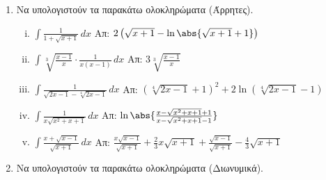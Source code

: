


\everymath{\displaystyle}
\pagestyle{askhseis}



\begin{center}
  \minibox{\large\bfseries \textcolor{Col1}{Ολοκληρώματα}}
\end{center}

\vspace{\baselineskip}

\begin{enumerate}
  \item Να υπολογιστούν τα παρακάτω ολοκληρώματα (Άρρητες).

    \begin{enumerate}[i)]
      \item $ \int \frac{1}{1 + \sqrt{x+1}} \,{dx} $ \hfill Απ: $
        2\left(\sqrt{x+1} - \ln{\abs{\sqrt{x+1} + 1}}\right) $
      \item $ \int \sqrt[3]{\frac{x-1}{x}} \cdot \frac{1}{x(x-1)} \,{dx} $
        \hfill Απ: $ 3 \sqrt[3]{\frac{x-1}{x}} $
      \item $ \int \frac{1}{\sqrt{2x-1} - \sqrt[4]{2x-1}} \,{dx} $ \hfill
        Απ:	$ \left(\sqrt[4]{2x-1} + 1\right)^{2}+2\ln{\left(\sqrt[4]{2x-1}-1 \right)} $
      \item $ \int \frac{1}{x \sqrt{x^{2}+x+1}} \,{dx} $ \hfill Απ: $
        \ln{\abs{\frac{x - \sqrt{x^{2}+x+1} +1}{x - \sqrt{x^{2}+x+1} -1}}} $
      \item $ \int \frac{x + \sqrt{x-1}}{\sqrt{x+1}} \,{dx} $ \hfill Απ: $
        \frac{x \sqrt{x-1}}{\sqrt{x+1}} + \frac{2}{3} x \sqrt{x+1} +
        \frac{\sqrt{x-1}}{\sqrt{x+1}} - \frac{4}{3} \sqrt{x+1}  $
    \end{enumerate}

  \item Να υπολογιστούν τα παρακάτω ολοκληρώματα (Διωνυμικά).


\end{enumerate}

